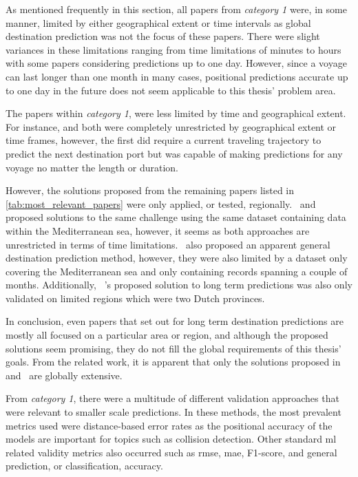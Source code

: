
As mentioned frequently in this section, all papers from \textit{category 1} were, in some manner, limited by either geographical extent or time intervals as global destination prediction was not the focus of these papers. There were slight variances in these limitations ranging from time limitations of minutes to hours with some papers considering predictions up to one day. However, since a voyage can last longer than one month in many cases, positional predictions accurate up to one day in the future does not seem applicable to this thesis' problem area.

The papers within \textit{category 1}, were less limited by time and geographical extent. For instance, \cite{Zhang2020AISApproach} and \cite{lechtenberg2019} both were completely unrestricted by geographical extent or time frames, however, the first did require a current traveling trajectory to predict the next destination port but was capable of making predictions for any voyage no matter the length or duration.

However, the solutions proposed from the remaining papers listed in \cref{tab:most_relevant_papers} were only applied, or tested, regionally.~\cite{Rosca2018GrandRoutes} and~\cite{Bachar2018GrandDestination} proposed solutions to the same challenge using the same dataset containing data within the Mediterranean sea, however, it seems as both approaches are unrestricted in terms of time limitations.~\cite{Karatas2020TrajectoryData} also proposed an apparent general destination prediction method, however, they were also limited by a dataset only covering the Mediterranean sea and only containing records spanning a couple of months. Additionally, ~\cite{Dobrkovic2018MaritimeData}'s proposed solution to long term predictions was also only validated on limited regions which were two Dutch provinces.

In conclusion, even papers that set out for long term destination predictions are mostly all focused on a particular area or region, and although the proposed solutions seem promising, they do not fill the global requirements of this thesis' goals. From the related work, it is apparent that only the solutions proposed in~\cite{lechtenberg2019} and~\cite{Zhang2020AISApproach} are globally extensive.


From \textit{category 1}, there were a multitude of different validation approaches that were relevant to smaller scale predictions. In these methods, the most prevalent metrics used were distance-based error rates as the positional accuracy of the models are important for topics such as collision detection. Other standard \acrshort{ml} related validity metrics also occurred such as \acrfull{rmse}, \acrfull{mae}, F1-score, and general prediction, or classification, accuracy.

